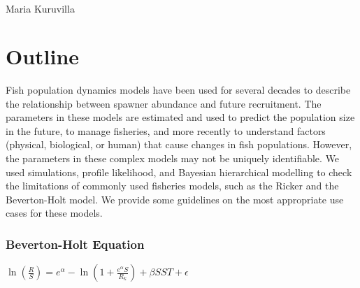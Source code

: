 \documentclass[10pt,letterpaper]{article}
\begin{document}
\vspace*{0.2in}


\begin{flushleft}
{\Large
\textbf{} %
}
\newline
\\
Maria Kuruvilla\textsuperscript{}\\
\bigskip
\bigskip
\end{flushleft}


\linenumbers

\section{Outline}\label{outline}

Fish population dynamics models have been used for several decades to
describe the relationship between spawner abundance and future
recruitment. The parameters in these models are estimated and used to
predict the population size in the future, to manage fisheries, and more
recently to understand factors (physical, biological, or human) that
cause changes in fish populations. However, the parameters in these
complex models may not be uniquely identifiable. We used simulations,
profile likelihood, and Bayesian hierarchical modelling to check the
limitations of commonly used fisheries models, such as the Ricker and
the Beverton-Holt model. We provide some guidelines on the most
appropriate use cases for these models.

\subsubsection{Beverton-Holt Equation}\label{beverton-holt-equation}

\(\ln(\frac{R}{S}) = e^{\alpha} - \ln(1 + \frac{e^{\alpha} S}{R_k}) + \beta SST + \epsilon\)
\end{document}
